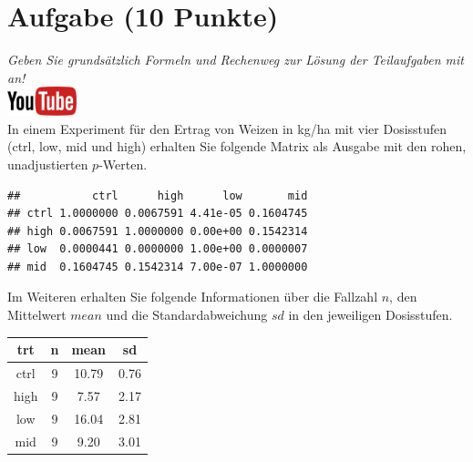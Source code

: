 \documentclass[a4paper, 9pt]{scrartcl}\usepackage[]{graphicx}\usepackage[]{xcolor}
\makeatletter
\newenvironment{kframe}{%
 \def\at@end@of@kframe{}%
 \ifinner\ifhmode%
  \def\at@end@of@kframe{\end{minipage}}%
  \begin{minipage}{\columnwidth}%
 \fi\fi%
 \def\FrameCommand##1{\hskip\@totalleftmargin \hskip-\fboxsep
 \colorbox{shadecolor}{##1}\hskip-\fboxsep
     \hskip-\linewidth \hskip-\@totalleftmargin \hskip\columnwidth}%
 \MakeFramed {\advance\hsize-\width
   \@totalleftmargin\z@ \linewidth\hsize
   \@setminipage}}%
 {\par\unskip\endMakeFramed%
 \at@end@of@kframe}
\newenvironment{knitrout}{}{} %
\makeatother
\begin{document}
 
\clearpage

\section{Aufgabe \hfill (10 Punkte)}

\textit{Geben Sie grunds{\"a}tzlich Formeln und Rechenweg zur L{\"o}sung der
  Teilaufgaben mit an!} \\[1Ex]

 \hfill\href{https://youtu.be/RagTFFKFbFg}{\includegraphics[width =
   2cm]{img/youtube}}\\[1Ex]



 
 In einem Experiment f{\"u}r den Ertrag von Weizen in kg/ha mit vier
 Dosisstufen (ctrl, low, mid und high) erhalten Sie folgende Matrix als
 \Rlogo Ausgabe mit den rohen, unadjustierten $p$-Werten.



\begin{knitrout}
\color{fgcolor}\begin{kframe}
\begin{verbatim}
##           ctrl      high      low       mid
## ctrl 1.0000000 0.0067591 4.41e-05 0.1604745
## high 0.0067591 1.0000000 0.00e+00 0.1542314
## low  0.0000441 0.0000000 1.00e+00 0.0000007
## mid  0.1604745 0.1542314 7.00e-07 1.0000000
\end{verbatim}
\end{kframe}
\end{knitrout}

Im Weiteren erhalten Sie folgende Informationen {\"u}ber die Fallzahl $n$, den
Mittelwert $mean$ und die Standardabweichung $sd$ in den jeweiligen Dosisstufen.

\begin{knitrout}
\color{fgcolor}\begin{table}[!h]
\centering
\begin{tabular}{cccc}
\toprule
trt & n & mean & sd\\
\midrule
ctrl & 9 & 10.79 & 0.76\\
high & 9 & 7.57 & 2.17\\
low & 9 & 16.04 & 2.81\\
mid & 9 & 9.20 & 3.01\\
\bottomrule
\end{tabular}
\end{table}

\end{knitrout}
\end{document}
